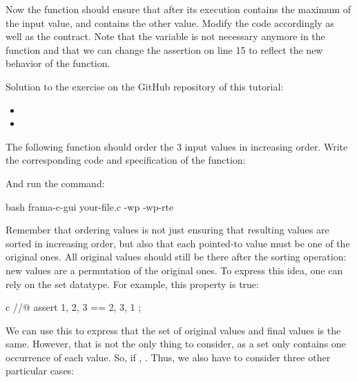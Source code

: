 Now the function should ensure that after its execution 
contains the maximum of the input value, and  contains the
other value. Modify the code accordingly as well as the contract. Note that
the variable  is not necessary anymore in the 
function and that we can change the assertion on line 15 to reflect the
new behavior of the function.


\begin{Information}
  Solution to the exercise on the GitHub repository of this tutorial:
  \begin{itemize}
    \item {}
    \item {}
  \end{itemize}
\end{Information}





The following function should order the 3 input values in increasing order.
Write the corresponding code and specification of the function:




And run the command:


\begin{CodeBlock}{bash}
frama-c-gui your-file.c -wp -wp-rte
\end{CodeBlock}


Remember that ordering values is not just ensuring that resulting values
are sorted in increasing order, but also that each pointed-to value must be one of the original
ones. All original values should still be there after the sorting operation:
new values are a permutation of the original ones. To express this idea, one
can rely on the set datatype. For example, this property is true:


\begin{CodeBlock}{c}
//@ assert { 1, 2, 3 } == { 2, 3, 1 };
\end{CodeBlock}


We can use this to express that the set of original values and final values
is the same. However, that is not the only thing to consider, as a set only
contains one occurrence of each value. So, if ,
. Thus, we also have to consider three
other particular cases:


